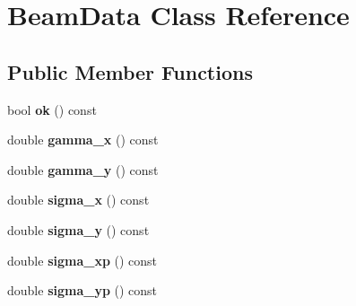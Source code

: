 \hypertarget{classBeamData}{}\section{Beam\+Data Class Reference}
\label{classBeamData}
\subsection*{Public Member Functions}
\begin{DoxyCompactItemize}
\item 
\mbox{\label{classBeamData_ac4ff99b7261467265ac3912e470d7d7e}} 
bool {\bfseries ok} () const
\item 
\mbox{\label{classBeamData_a4a8455b1f348e72dd5d3bb8e6b2c80f8}} 
double {\bfseries gamma\+\_\+x} () const
\item 
\mbox{\label{classBeamData_a6c4c04483593a1d5fb079c013d233c85}} 
double {\bfseries gamma\+\_\+y} () const
\item 
\mbox{\label{classBeamData_ae731a1497167bff681c4bc07034b6ed8}} 
double {\bfseries sigma\+\_\+x} () const
\item 
\mbox{\label{classBeamData_a1d6ef4b768a88bf4540fc88850f1c674}} 
double {\bfseries sigma\+\_\+y} () const
\item 
\mbox{\label{classBeamData_a7e16ee61642e673914a6e7a48910b1b4}} 
double {\bfseries sigma\+\_\+xp} () const
\item 
\mbox{\label{classBeamData_aaf10e290313f13ef8eafd741c2950652}} 
double {\bfseries sigma\+\_\+yp} () const
\end{DoxyCompactItemize}

